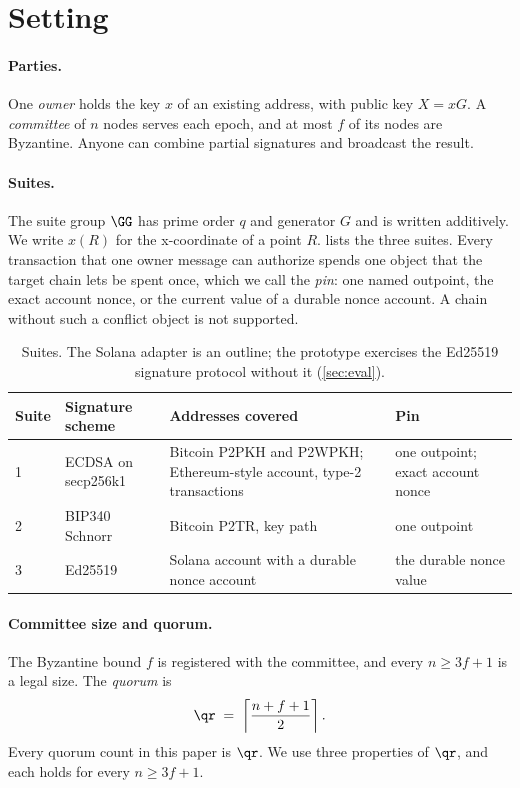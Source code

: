 \section{Setting}\label{sec:setting}

\paragraph{Parties.} One \emph{owner} holds the key $x$ of an existing address, with public key $X = xG$. A \emph{committee} of $n$ nodes serves each epoch, and at most $f$ of its nodes are Byzantine. Anyone can combine partial signatures and broadcast the result.

\paragraph{Suites.} The suite group $\GG$ has prime order $q$ and generator $G$ and is written additively. We write $x(R)$ for the x-coordinate of a point $R$.  lists the three suites. Every transaction that one owner message can authorize spends one object that the target chain lets be spent once, which we call the \emph{pin}: one named outpoint, the exact account nonce, or the current value of a durable nonce account. A chain without such a conflict object is not supported.

\begin{table}[t]
\centering
\small
\begin{tabularx}{\linewidth}{@{}ll>{\raggedright\arraybackslash}X>{\raggedright\arraybackslash}p{3.6cm}@{}}
\toprule
Suite & Signature scheme & Addresses covered & Pin \\
\midrule
1 & ECDSA on secp256k1 & Bitcoin P2PKH and P2WPKH; Ethereum-style account, type-2 transactions & one outpoint; exact account nonce \\
2 & BIP340 Schnorr & Bitcoin P2TR, key path & one outpoint \\
3 & Ed25519 & Solana account with a durable nonce account & the durable nonce value \\
\bottomrule
\end{tabularx}
\caption{Suites. The Solana adapter is an outline; the prototype exercises the Ed25519 signature protocol without it (\cref{sec:eval}).}
\label{tab:suites}
\end{table}

\paragraph{Committee size and quorum.} The Byzantine bound $f$ is registered with the committee, and every $n \ge 3f+1$ is a legal size. The \emph{quorum} is
\[
  \qr \;=\; \left\lceil \frac{n+f+1}{2} \right\rceil .
\]
Every quorum count in this paper is $\qr$. We use three properties of $\qr$, and each holds for every $n \ge 3f+1$.

